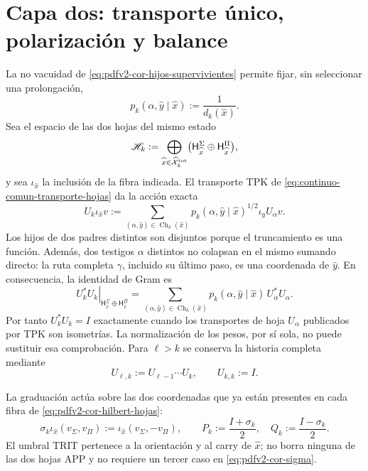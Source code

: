 \section{Capa dos: transporte único, polarización y balance}

La no vacuidad de \eqref{eq:pdfv2-cor-hijos-supervivientes} permite fijar,
sin seleccionar una prolongación,
\begin{equation}
\label{eq:pdfv2-cor-peso-conteo}
 p_k(\alpha,\widehat y\mid\widehat x)
 :=\frac1{d_k(\widehat x)}.
\end{equation}
Sea el espacio de las dos hojas del mismo estado
\begin{equation}
\label{eq:pdfv2-cor-hilbert-hojas}
 \mathscr H_k:=
 \bigoplus_{\widehat x\in\widehat{\mathcal X}^{\rm tot}_k}
 \bigl(\mathsf H_{\widehat x}^{\Sigma}
       \oplus\mathsf H_{\widehat x}^{\Pi}\bigr),
\end{equation}
y sea \(\iota_{\widehat x}\) la inclusión de la fibra indicada. El transporte
TPK de \eqref{eq:continuo-comun-transporte-hojas} da la acción exacta
\begin{equation}
\label{eq:pdfv2-cor-u-comun}
 U_k\iota_{\widehat x}v:=
 \sum_{(\alpha,\widehat y)\in\operatorname{Ch}_k(\widehat x)}
 p_k(\alpha,\widehat y\mid\widehat x)^{1/2}
 \iota_{\widehat y}U_\alpha v.
\end{equation}
Los hijos de dos padres distintos son disjuntos porque el truncamiento es una
función. Además, dos testigos \(\alpha\) distintos no colapsan en el mismo
sumando directo: la ruta completa \(\gamma\), incluido su último paso, es una
coordenada de \(\widehat y\). En consecuencia, la identidad de Gram es
\begin{equation}
\label{eq:pdfv2-cor-u-gram}
 \left.U_k^*U_k\right|_{\mathsf H_{\widehat x}^{\Sigma}
       \oplus\mathsf H_{\widehat x}^{\Pi}}
 =
 \sum_{(\alpha,\widehat y)\in\operatorname{Ch}_k(\widehat x)}
 p_k(\alpha,\widehat y\mid\widehat x)\,U_\alpha^*U_\alpha.
\end{equation}
Por tanto \(U_k^*U_k=I\) exactamente cuando los transportes de hoja
\(U_\alpha\) publicados por TPK son isometrías. La normalización de los pesos,
por sí sola, no puede sustituir esa comprobación.
Para \(\ell>k\) se conserva la historia completa mediante
\begin{equation}
\label{eq:pdfv2-cor-u-iterado}
 U_{\ell,k}:=U_{\ell-1}\cdots U_k,
 \qquad U_{k,k}:=I.
\end{equation}

La graduación actúa sobre las dos coordenadas que ya están presentes en cada
fibra de \eqref{eq:pdfv2-cor-hilbert-hojas}:
\begin{equation}
\label{eq:pdfv2-cor-sigma}
 \sigma_k\iota_{\widehat x}(v_\Sigma,v_\Pi)
 :=\iota_{\widehat x}(v_\Sigma,-v_\Pi),
\qquad
 P_k:=\frac{I+\sigma_k}{2},\quad
 Q_k:=\frac{I-\sigma_k}{2}.
\end{equation}
El umbral TRIT pertenece a la orientación y al carry de
\(\widehat x\); no borra ninguna de las dos hojas APP y no requiere un tercer
caso en \eqref{eq:pdfv2-cor-sigma}.

